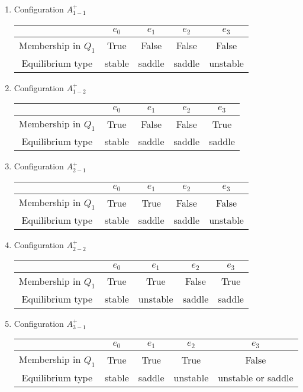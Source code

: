 \documentclass{amsart}
\theoremstyle{definition}
\numberwithin{equation}{section}
\begin{document}
\begin{enumerate}
 \item Configuration $A_{1-1}^+$

 \medskip
 \begin{tabular}[hc]{|c|c|c|c|c|}
\hline
& $e_0$ & $e_1$ & $e_2$ & $e_3$ \\
\hline
Membership in $Q_1$ & True & False & False & False\\
\hline
Equilibrium type & stable & saddle & saddle & unstable  \\
\hline
\end{tabular}
\medskip

 \item Configuration $A_{1-2}^+$

 \medskip
 \begin{tabular}[hc]{|c|c|c|c|c|}
\hline
& $e_0$ & $e_1$ & $e_2$ & $e_3$ \\
\hline
Membership in $Q_1$ & True & False & False &True\\
\hline
Equilibrium type & stable & saddle & saddle & saddle \\
\hline
\end{tabular}
\medskip

 \item Configuration $A_{2-1}^+$

  \medskip
 \begin{tabular}[hc]{|c|c|c|c|c|}
\hline
& $e_0$ & $e_1$ & $e_2$ & $e_3$ \\
\hline
Membership in $Q_1$ & True & True & False & False\\
\hline
Equilibrium type & stable & saddle & saddle & unstable \\
\hline
\end{tabular}
\medskip


 \item Configuration $A_{2-2}^+$

 \medskip
 \begin{tabular}[hc]{|c|c|c|c|c|}
\hline
& $e_0$ & $e_1$ & $e_2$ & $e_3$ \\
\hline
Membership in $Q_1$ & True & True & False &True\\
\hline
Equilibrium type & stable & unstable & saddle & saddle \\
\hline
\end{tabular}
\medskip 
 

\item Configuration $A_{3-1}^+$

\medskip
 \begin{tabular}[hc]{|c|c|c|c|c|}
\hline
& $e_0$ & $e_1$ & $e_2$ & $e_3$ \\
\hline
Membership in $Q_1$ & True & True & True & False\\
\hline
Equilibrium type & stable & saddle & unstable & unstable or saddle \\
\hline
\end{tabular}
\medskip



\end{enumerate}
\end{document}
